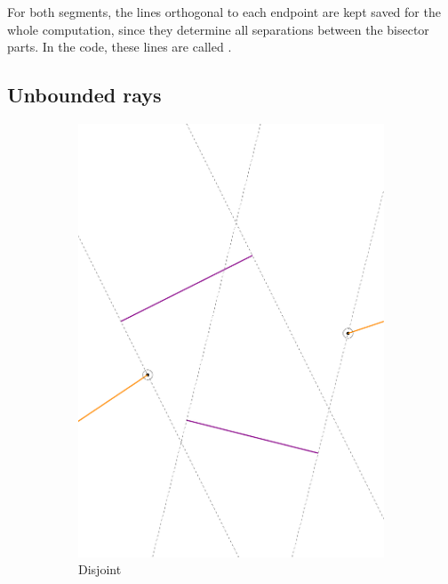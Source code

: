 \documentclass[11pt,a4paper,english]{article}
\begin{document}
	For both segments, the lines orthogonal to each endpoint are kept saved for the whole computation, since they determine all separations between the bisector parts. In the code, these lines are called .
	
	
	\subsection{Unbounded rays}
	\begin{figure}[h]
	\begin{subfigure}[b]{0.3\textwidth}
		\includegraphics[width=\textwidth]{two_unbounded_rays}
    	\caption{Disjoint \label{fig:two_unbounded_rays}}
	\end{subfigure}
	\qquad
	\begin{subfigure}[b]{0.3\textwidth}

\end{subfigure}
\end{figure}
\end{document}
